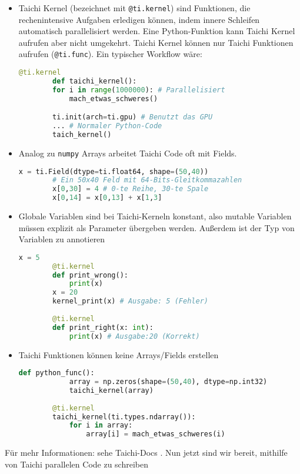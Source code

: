 \documentclass{article}
\begin{document}
\begin{itemize}
	\item Taichi Kernel (bezeichnet mit \lstinline|@ti.kernel|) sind Funktionen, die rechenintensive Aufgaben erledigen können, indem innere Schleifen automatisch parallelisiert werden. Eine Python-Funktion kann Taichi Kernel aufrufen aber nicht umgekehrt. Taichi Kernel können nur Taichi Funktionen aufrufen (\lstinline|@ti.func|). Ein typischer Workflow wäre:
	\begin{lstlisting}[language=python]
		@ti.kernel
		def taichi_kernel():
		for i in range(1000000): # Parallelisiert
			mach_etwas_schweres()

		ti.init(arch=ti.gpu) # Benutzt das GPU 
		... # Normaler Python-Code
		taich_kernel() 
	\end{lstlisting}

	\item Analog zu \lstinline|numpy| Arrays arbeitet Taichi Code oft mit Fields.	
	\begin{lstlisting}[language=python]
		x = ti.Field(dtype=ti.float64, shape=(50,40))
		# Ein 50x40 Feld mit 64-Bits-Gleitkommazahlen
		x[0,30] = 4 # 0-te Reihe, 30-te Spale
		x[0,14] = x[0,13] + x[1,3]
	\end{lstlisting}
	
	\item Globale Variablen sind bei Taichi-Kerneln konstant, also mutable Variablen müssen explizit als Parameter übergeben werden. Außerdem ist der Typ von Variablen zu annotieren
		\begin{lstlisting}[language=python]
		x = 5
		@ti.kernel
		def print_wrong():
			print(x)
		x = 20
		kernel_print(x) # Ausgabe: 5 (Fehler)
		
		@ti.kernel
		def print_right(x: int):
			print(x) # Ausgabe:20 (Korrekt)
	\end{lstlisting}
	
	\item Taichi Funktionen können keine Arrays/Fields erstellen
		\begin{lstlisting}[language=python]
		def python_func():
			array = np.zeros(shape=(50,40), dtype=np.int32)
			taichi_kernel(array)
		
		@ti.kernel
		taichi_kernel(ti.types.ndarray()):
			for i in array:
				array[i] = mach_etwas_schweres(i)
	\end{lstlisting}
\end{itemize}
Für mehr Informationen: sehe Taichi-Docs \cite{taichi}. Nun jetzt sind wir bereit, mithilfe von Taichi parallelen Code zu schreiben
\end{document}
